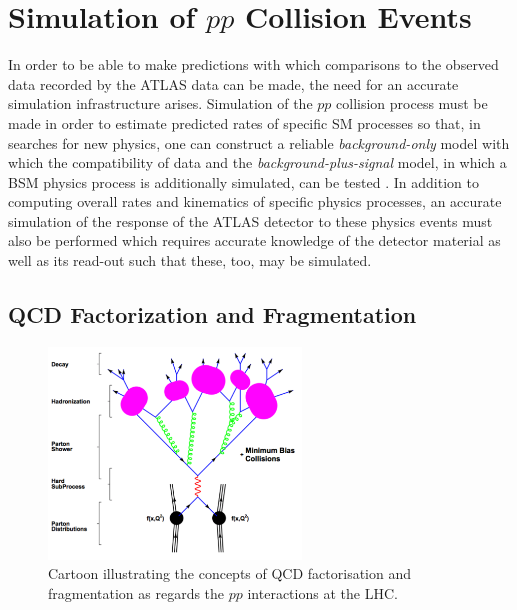 \chapter{Simulation of $pp$ Collision Events}
\label{chap:simulation}

In order to be able to make predictions with which comparisons to the observed data
recorded by the ATLAS data can be made, the need for an accurate simulation infrastructure
arises.
Simulation of the $pp$ collision process must be made in order to estimate predicted
rates of specific SM processes so that, in searches for new physics, one can
construct a reliable \textit{background-only} model with which the compatibility of data
and the \textit{background-plus-signal} model, in which a BSM physics process is additionally simulated,
can be tested {\color{red}{NEEDS RE-WORDING}}.
In addition to computing overall rates and kinematics of specific physics processes, an accurate
simulation of the response of the ATLAS detector to these physics events must also be performed which
requires accurate knowledge of the detector material as well as its read-out such that these, too,
may be simulated.


\section{QCD Factorization and Fragmentation}
\label{sec:fact_frag}

\begin{figure}[!htb]
    \begin{center}
        \includegraphics[width=0.6\textwidth]{figures/event_simulation/pp_simulation_steps}
        \caption{
            Cartoon illustrating the concepts of QCD factorisation and fragmentation as regards
            the $pp$ interactions at the LHC.
            {\color{red}{redo this figure}}
        }
        \label{fig:pp_sim_steps}
    \end{center}
\end{figure}

